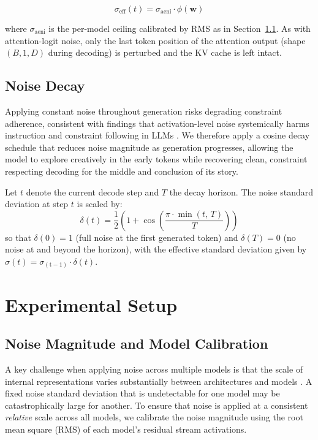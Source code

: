 \documentclass[11pt]{article}
\begin{document}
\begin{equation}
    \sigma_{\text{eff}}(t) = \sigma_{\text{aeni}} \cdot \phi(\mathbf{w})
\end{equation}

where $\sigma_{\text{aeni}}$ is the per-model ceiling calibrated by RMS as in Section~\ref{sec:calibration}. As with attention-logit noise, only the last token position of the attention output (shape $(B, 1, D)$ during decoding) is perturbed and the KV cache is left intact.

\subsection{Noise Decay}
\label{sec:decay}
Applying constant noise throughout generation risks degrading constraint adherence, consistent with findings that activation-level noise
systemically harms instruction and constraint following in LLMs \cite{shahani2025noise}. We therefore apply a cosine decay schedule that reduces noise magnitude as generation progresses, allowing the model to explore creatively in the early tokens while recovering clean, constraint respecting decoding for the middle and conclusion of its story.

Let $t$ denote the current decode step and $T$ the decay horizon. The noise standard deviation at step $t$ is scaled by:
\[
    \delta(t) = \frac{1}{2}\left(1 + \cos\!\left(\frac{\pi \cdot \min(t,\, T)}{T}\right)\right)
\]
so that $\delta(0) = 1$ (full noise at the first generated token) and $\delta(T) = 0$
(no noise at and beyond the horizon), with the effective standard deviation given by
$\sigma(t) = \sigma_{\mathrm{(t-1)}} \cdot \delta(t)$.


\section{Experimental Setup}

\subsection{Noise Magnitude and Model Calibration}
\label{sec:calibration}
A key challenge when applying noise across multiple models is that the scale of internal representations varies substantially between architectures and models \cite{dettmers2022llmint8, sun2024massive}. A fixed noise standard deviation that is undetectable for one model may be catastrophically large for another. To ensure that noise is applied at a consistent \textit{relative} scale across all models, we calibrate the noise magnitude using the root mean square (RMS) of each model's residual stream activations.
\end{document}
